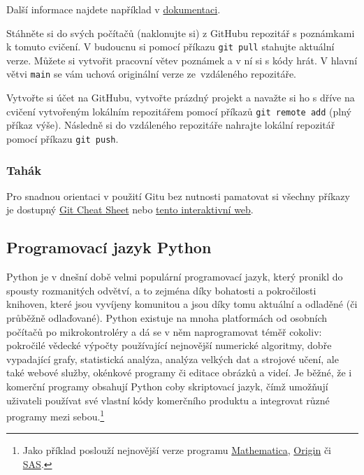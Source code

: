 \documentclass[a4paper,11pt,twoside]{article}
\def\code#1{\textnormal{\texttt{#1}}}
\theoremstyle{red}
\theoremstyle{green}
\begin{document}
    Další informace najdete například v \href{https://git-scm.com/book/cs/v2/Z%C3%A1klady-pr%C3%A1ce-se-syst%C3%A9mem-Git-Pr%C3%A1ce-se-vzd%C3%A1len%C3%BDmi-repozit%C3%A1%C5%99i}{dokumentaci}.

    \begin{task}
        Stáhněte si do svých počítačů (naklonujte si) z GitHubu repozitář s poznámkami k tomuto cvičení.
        V budoucnu si pomocí příkazu \code{git pull} stahujte aktuální verze.
        Můžete si vytvořit pracovní větev poznámek a v ní si s kódy hrát.
        V hlavní větvi \code{main} se vám uchová originální verze ze~vzdáleného repozitáře.
    \end{task}

    \begin{task}
        Vytvořte si účet na GitHubu, vytvořte prázdný projekt a navažte si ho s dříve na cvičení vytvořeným lokálním repozitářem pomocí příkazů \code{git remote add} (plný příkaz výše).
        Následně si do vzdáleného repozitáře nahrajte lokální repozitář pomocí příkazu \code{git push}. 
    \end{task}

\subsubsection{Tahák}
    Pro snadnou orientaci v použití Gitu bez nutnosti pamatovat si všechny příkazy je dostupný \href{https://training.github.com/downloads/github-git-cheat-sheet.pdf}{Git Cheat Sheet} nebo \href{https://ndpsoftware.com/git-cheatsheet.html}{tento interaktivní web}.

\subsection{Programovací jazyk Python}
    Python je v dnešní době velmi populární programovací jazyk, který pronikl do spousty rozmanitých odvětví, a to zejména díky bohatosti a pokročilosti knihoven, které jsou vyvíjeny komunitou a jsou díky tomu aktuální a odladěné (či průběžně odlaďované).
    Python existuje na mnoha platformách od osobních počítačů po mikrokontroléry a dá se v něm naprogramovat téměř cokoliv: pokročilé vědecké výpočty používající nejnovější numerické algoritmy, dobře vypadající grafy, statistická analýza, analýza velkých dat a strojové učení, ale také webové služby, okénkové programy či editace obrázků a videí.
    Je běžné, že i komerční programy obsahují Python coby skriptovací jazyk, čímž umožňují uživateli používat své vlastní kódy  komerčního produktu a integrovat různé programy mezi sebou.\footnote{
        Jako příklad poslouží nejnovější verze programu \href{https://www.wolfram.com/language/12/external-system-integration/evaluate-python-in-a-notebook.html}{Mathematica}, \href{https://www.originlab.com/doc/python/Run-Python-in-Origin}{Origin} či \href{https://developer.sas.com/guides/python.html}{SAS}.
    }
    
\end{document}
